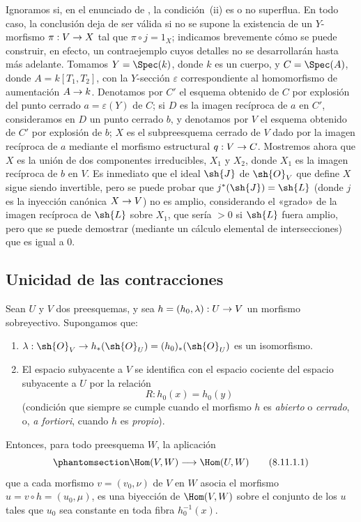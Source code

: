 \documentclass[oneside,10pt]{amsart}
\makeatletter
\newcommand{\ega@arrow}[2]{\mathchoice{#1}{#2}{#2}{#2}}
\renewcommand{\to}{\ega@arrow{\longrightarrow}{\rightarrow}}
\newcommand{\oldpage}[2][]{\marginnote{\normalfont\footnotesize\textbf{#1}~|~#2}\ignorespaces}
\let\EGAOriginalLabel\label
\renewcommand{\label}[1]{\phantomsection\EGAOriginalLabel{#1}}
\makeatother
\begin{document}
\begin{remark}[8.10.7]
\label{II.8.10.7}
Ignoramos si, en el enunciado de , la condición~(ii) es o no superflua.
En todo caso, la conclusión deja de ser válida si no se supone la existencia de un $Y$-morfismo $\pi:V\to X$ tal que $\pi\circ j=1_X$;
indicamos brevemente cómo se puede construir, en efecto, un contraejemplo cuyos detalles no se desarrollarán hasta más adelante.
Tomamos $Y=\Spec(k)$, donde $k$ es un cuerpo, y $C=\Spec(A)$, donde $A=k[T_1,T_2]$, con la $Y$-sección $\varepsilon$ correspondiente al homomorfismo de aumentación $A\to k$.
Denotamos por $C'$ el esquema obtenido de $C$ por explosión del punto cerrado $a=\varepsilon(Y)$ de $C$;
si $D$ es la imagen recíproca de $a$ en $C'$, consideramos en $D$ un punto cerrado $b$,
\oldpage[II]{189}
y denotamos por $V$ el esquema obtenido de $C'$ por explosión de $b$;
$X$ es el subpreesquema cerrado de $V$ dado por la imagen recíproca de $a$ mediante el morfismo estructural $q:V\to C$.
Mostremos ahora que $X$ es la unión de dos componentes irreducibles, $X_1$ y $X_2$, donde $X_1$ es la imagen recíproca de $b$ en $V$.
Es inmediato que el ideal $\sh{J}$ de $\sh{O}_V$ que define $X$ sigue siendo invertible, pero se puede probar que $j^*(\sh{J})=\sh{L}$ (donde $j$ es la inyección canónica $X\to V$) no es amplio, considerando el «grado» de la imagen recíproca de $\sh{L}$ sobre $X_1$, que sería $>0$ si $\sh{L}$ fuera amplio, pero que se puede demostrar (mediante un cálculo elemental de intersecciones) que es igual a $0$.
\end{remark}

\subsection{Unicidad de las contracciones}
\label{subsection:II.8.11}

\begin{lemma}[8.11.1]
\label{II.8.11.1}
Sean $U$ y $V$ dos preesquemas, y sea $h=(h_0,\lambda):U\to V$ un morfismo sobreyectivo.
Supongamos que:
\begin{enumerate}
  \item[$1^\circ$] $\lambda:\sh{O}_V\to h_*(\sh{O}_U)=(h_0)_*(\sh{O}_U)$ es un isomorfismo.
  \item[$2^\circ$] El espacio subyacente a $V$ se identifica con el espacio cociente del espacio subyacente a $U$ por la relación
  \[
      R:h_0(x)=h_0(y)
  \]
  \textup{(condición que siempre se cumple cuando el morfismo $h$ es \emph{abierto} o \emph{cerrado}, o, \emph{a fortiori}, cuando $h$ es \emph{propio})}.
\end{enumerate}
Entonces, para todo preesquema $W$, la aplicación
\[
\label{II.8.11.1.1}
    \Hom(V,W)\longrightarrow\Hom(U,W)
\tag{8.11.1.1}
\]
que a cada morfismo $v=(v_0,\nu)$ de $V$ en $W$ asocia el morfismo $u=v\circ h=(u_0,\mu)$, es una biyección de $\Hom(V,W)$ sobre el conjunto de los $u$ tales que $u_0$ sea constante en toda fibra $h_0^{-1}(x)$.
\end{lemma}
\end{document}
